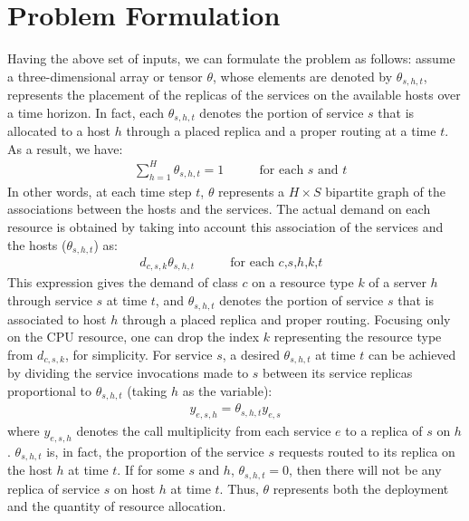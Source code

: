 \section{Problem Formulation}  
\label{sec:problem-formulation}  
  Having the above set of inputs, we can formulate the problem as follows:    
 assume a three-dimensional array or tensor $\theta$, whose elements are denoted by $\theta_{s,h,t}$, represents the placement of the replicas of the services on the available hosts over a time horizon.
 In fact, each $\theta_{s,h,t}$ denotes the portion of service $s$ that is allocated to a host $h$ through a placed replica and a proper routing at a time $t$. As a result, we have: 
 \begin{align} 
&  \sum_{h=1}^H \theta_{s,h,t} = 1 & \qquad \text{for each $s$ and $t$} \label{eq:thata_totals_to_one}   
 \end{align}     
 In other words, at each time step $t$, $\theta$ represents a $H\times S$ bipartite graph  of the associations between the hosts and the services. 
 The actual demand on each resource is obtained by taking into account this association of the services and the hosts ($\theta_{s,h,t}$)  as:
 \begin{align} 
 d_{c,s,k} \theta_{s,h,t}			\qquad & \text{for each $c$,$s$,$h$,$k$,$t$  }    
	 \label{eq:thata_as_proportion}   
 \end{align} 
  This expression gives the demand of class $c$ on a resource type $k$ of a server $h$  through service $s$ at time $t$, and $\theta_{s,h,t}$  denotes the portion of service $s$ that is associated to host $h$ through a placed replica and proper routing. 
 Focusing only on the CPU resource, one can drop the index $k$ representing the resource type from $d_{c,s,k}$, for simplicity. 
 For service $s$, a desired $\theta_{s,h,t}$ at time $t$ can be achieved by dividing the service invocations made to $s$ between its service replicas proportional to $\theta_{s,h,t}$ (taking $h$ as the variable):  
   \begin{align}
    y_{e,s,h} =   \theta_{s,h,t}  y_{e,s} 
   \end{align}
   where $y_{e,s,h}$ denotes the call multiplicity from each service $e$ to a replica of $s$ on $h$. $\theta_{s,h,t}$ is, in fact, the proportion of the service $s$ requests routed to its replica on the host $h$ at time $t$. 
	If for some $s$ and $h$, $\theta_{s,h,t}=0$, then there will not be any replica of service $s$ on host $h$ at time $t$. Thus, $\theta$ represents both the deployment and the quantity of resource allocation. 
 
